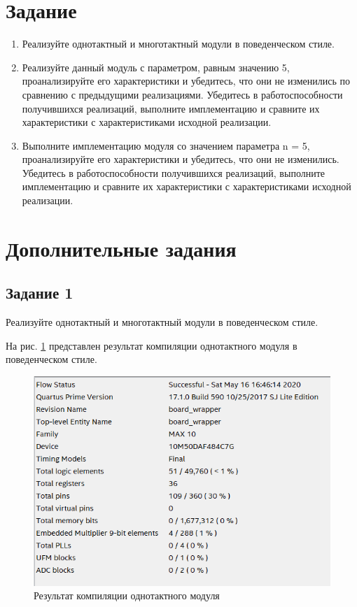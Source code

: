\documentclass[a4paper,14pt]{article}
\begin{document}
	
	\tableofcontents
	\pagebreak
	\section{Задание}
	
	\begin{enumerate}
		\item Реализуйте однотактный и многотактный модули в поведенческом стиле.
		
		\item Реализуйте данный модуль с параметром, равным значению 5, проанализируйте его	характеристики и убедитесь, что они не изменились по сравнению с предыдущими	реализациями. Убедитесь в работоспособности получившихся реализаций, выполните имплементацию и сравните их	характеристики с характеристиками исходной реализации.
	
		\item Выполните имплементацию модуля со значением параметра n = 5, проанализируйте его	характеристики и убедитесь, что они не изменились. Убедитесь в работоспособности получившихся реализаций, выполните имплементацию и сравните их
		характеристики с характеристиками исходной реализации.
		 
	\end{enumerate}
	
	\section{Дополнительные задания}
	
	\subsection{Задание 1}
	
	Реализуйте однотактный и многотактный модули в поведенческом стиле.
	
	На рис. \ref{fig:z103} представлен результат компиляции однотактного модуля в поведенческом стиле.
	 
	{\small {}}
	
	\begin{figure}[H]
		\centering
		\includegraphics[width=0.8\linewidth]{images/z1_03}
		\caption{Результат компиляции однотактного модуля}
		\label{fig:z103}
	\end{figure}
			
\end{document}
